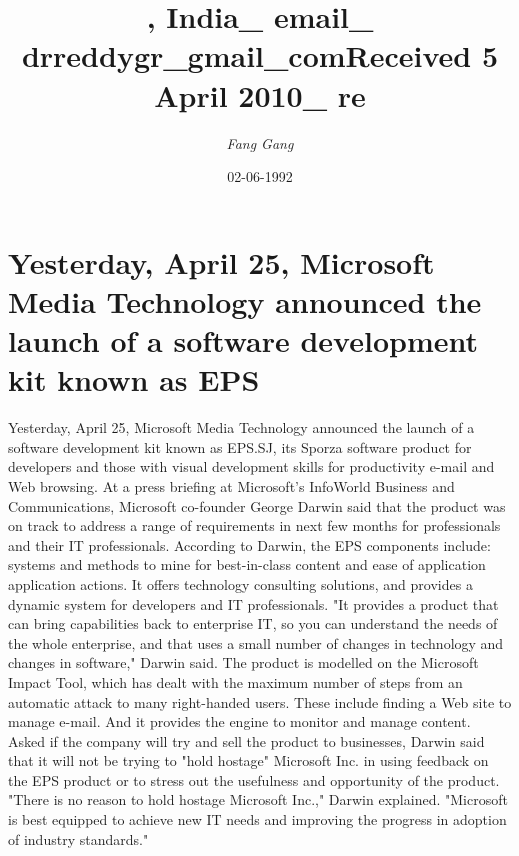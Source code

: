 \documentclass{article}%
\title{, India\_ email\_ drreddygr\_gmail\_comReceived 5 April 2010\_ re}%
\author{\textit{Fang Gang}}%
\date{02-06-1992}%
\begin{document}
%
\normalsize%
\maketitle%
\section{Yesterday, April 25, Microsoft Media Technology announced the launch of a software development kit known as EPS}%
\label{sec:Yesterday,April25,MicrosoftMediaTechnologyannouncedthelaunchofasoftwaredevelopmentkitknownasEPS}%
Yesterday, April 25, Microsoft Media Technology announced the launch of a software development kit known as EPS.SJ, its Sporza software product for developers and those with visual development skills for productivity e{-}mail and Web browsing.\newline%
At a press briefing at Microsoft's InfoWorld Business and Communications, Microsoft co{-}founder George Darwin said that the product was on track to address a range of requirements in next few months for professionals and their IT professionals.\newline%
According to Darwin, the EPS components include:\newline%
systems and methods to mine for best{-}in{-}class content and ease of application application actions. It offers technology consulting solutions, and provides a dynamic system for developers and IT professionals.\newline%
"It provides a product that can bring capabilities back to enterprise IT, so you can understand the needs of the whole enterprise, and that uses a small number of changes in technology and changes in software," Darwin said.\newline%
The product is modelled on the Microsoft Impact Tool, which has dealt with the maximum number of steps from an automatic attack to many right{-}handed users. These include finding a Web site to manage e{-}mail. And it provides the engine to monitor and manage content.\newline%
Asked if the company will try and sell the product to businesses, Darwin said that it will not be trying to "hold hostage" Microsoft Inc. in using feedback on the EPS product or to stress out the usefulness and opportunity of the product.\newline%
"There is no reason to hold hostage Microsoft Inc.," Darwin explained. "Microsoft is best equipped to achieve new IT needs and improving the progress in adoption of industry standards."\newline%
\end{document}
